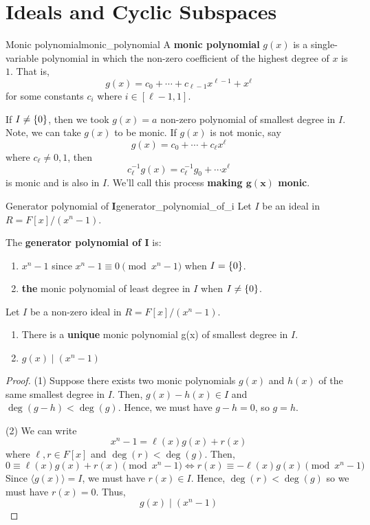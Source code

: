 \section{Ideals and Cyclic Subspaces}

\begin{Definition}{Monic polynomial}{monic_polynomial}
    A \textbf{monic polynomial} $ g(x) $ is a single-variable
    polynomial in which the non-zero coefficient of the highest degree of $ x $
    is $ 1 $. That is,
    \[ g(x)=c_0+\cdots+c_{\ell -1}x^{\ell -1}+ x^\ell \]
    for some constants $ c_i $ where $ i\in[\ell-1,1] $.
\end{Definition}

If $ I\neq \{0\} $, then we took $ g(x)=a $ non-zero
polynomial of smallest degree in $ I $. Note, we can
take $ g(x) $ to be monic. If $ g(x) $ is not monic, say
\[ g(x)=c_0+\cdots+c_\ell x^{\ell} \]
where $ c_\ell \neq 0, 1 $, then
\[ c_{\ell}^{-1}g(x)=c_\ell^{-1} g_0+\cdots x^\ell \]
is monic and is also in $ I $. We'll call this process
\textbf{making $ \bm{g(x)} $ monic}.

\begin{Definition}{Generator polynomial of $ \bm{I} $}{generator_polynomial_of_i}
    Let $ I $ be an ideal in $ R=F[x]/(x^n-1) $.

    The \textbf{generator polynomial of $ \bm{I} $} is:
    \begin{enumerate}[label=(\arabic*)]
        \item $ x^n-1 $ since $ x^n-1\equiv 0 \pmod{x^n-1} $ when $ I=\{0\} $.
        \item \textbf{the}
              monic polynomial of least degree in $ I $ when $ I \neq \{0\} $.
    \end{enumerate}
\end{Definition}

\begin{Theorem}{}{}
    Let $ I $ be a non-zero ideal in $ R=F[x]/(x^n-1) $.
    \begin{enumerate}[label=(\arabic*)]
        \item There is a \textbf{unique} monic polynomial
              g(x) of smallest degree in $ I $.
        \item $ g(x)\mid (x^n-1) $
    \end{enumerate}
\end{Theorem}

\begin{proof}
    (1) Suppose
    there exists two monic polynomials $ g(x) $ and $ h(x) $
    of the same smallest degree in $ I $.
    Then, $ g(x)-h(x)\in I $ and $ \deg(g-h)<\deg (g) $. Hence, we must
    have $ g-h=0 $, so $ g=h $.

    (2) We can write
    \[ x^n-1=\ell(x)g(x)+r(x) \]
    where $ \ell,r\in F[x] $ and $ \deg(r)<\deg(g) $. Then,
    \[ 0\equiv \ell (x)g(x)+r(x)\pmod{x^n-1}\iff r(x)\equiv -\ell(x)g(x)\pmod{x^n-1} \]
    Since $ \langle g(x)\rangle = I $, we must have $ r(x)\in I $.
    Hence, $ \deg(r)<\deg(g) $ so we must have $ r(x)=0 $. Thus,
    \[ g(x)\mid (x^n-1) \]
\end{proof}

